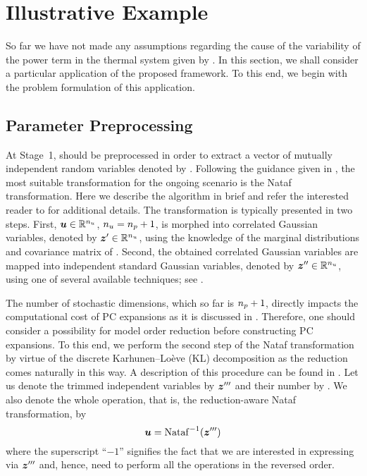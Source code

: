 \section{Illustrative Example}

So far we have not made any assumptions regarding the cause of the variability
of the power term in the thermal system given by . In this
section, we shall consider a particular application of the proposed framework.
To this end, we begin with the problem formulation of this application.

\subsection{Parameter Preprocessing}

At Stage~1, \vu should be preprocessed in order to extract a vector of mutually
independent random variables denoted by \vz. Following the guidance given in
, the most suitable transformation for the ongoing
scenario is the Nataf transformation. Here we describe the algorithm in brief
and refer the interested reader to \cite{li2008} for additional details. The
transformation is typically presented in two steps. First, $\boldsymbol{u} \in \mathbb{R}^{n_{u}}$,
${n_{u}} = {n_{p}} + 1$, is morphed into correlated Gaussian variables, denoted by $\boldsymbol{z}'
\in \mathbb{R}^{n_{u}}$, using the knowledge of the marginal distributions and covariance
matrix of \vu. Second, the obtained correlated Gaussian variables are mapped
into independent standard Gaussian variables, denoted by $\boldsymbol{z}'' \in \mathbb{R}^{n_{u}}$,
using one of several available techniques; see \cite{li2008}.

The number of stochastic dimensions, which so far is ${n_{p}}+ 1$, directly impacts
the computational cost of PC expansions as it is discussed in
. Therefore, one should consider a possibility
for model order reduction before constructing PC expansions. To this end, we
perform the second step of the Nataf transformation by virtue of the discrete
Karhunen--Lo\`{e}ve (KL) decomposition \cite{ghanem1991} as the reduction comes
naturally in this way. A description of this procedure can be found in
. Let us denote the trimmed independent variables by
$\boldsymbol{z}'''$ and their number by \nz. We also denote the whole operation, that is,
the reduction-aware Nataf transformation, by
\[
  \boldsymbol{u} = \mathrm{Nataf}^{-1}(\boldsymbol{z}''')
\]
where the superscript ``$-1$'' signifies the fact that we are interested in
expressing \vu via $\boldsymbol{z}'''$ and, hence, need to perform all the operations in
the reversed order.

